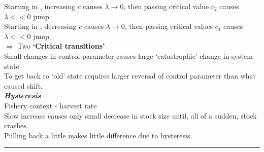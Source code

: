 \documentclass{article}
\newcommand{\ind}{\-\hspace{1cm}}
\newcommand*\circled[1]{\tikz[baseline=(char.base)]{
            \node[shape=circle,draw,inner sep=2pt] (char) {#1};}}
\begin{document}
Starting in \circled{3}, increasing $c$ causes $\lambda \to 0$, then passing critical value $c_2$ causes $\lambda << 0$ jump.\\
Starting in \circled{2}, decreasing $c$ causes $\lambda \to 0$, then passing critical values $c_1$ causes $\lambda << 0$ jump.\\

$\Rightarrow$ Two \textbf{`Critical transitions'}\\
\ind Small changes in control parameter causes large `catastrophic' change in system state\\
To get back to `old' state requires larger reversal of control parameter than what caused shift.\\
\ind \textbf{\emph{Hysteresis}}\\

Fishery context - harvest rate\\
\ind Slow increase causes only small decrease in stock size until, all of a sudden, stock crashes.\\
\ind Pulling back a little makes little difference due to hysteresis.\\

\rule[0.5ex]{\linewidth}{1pt}
\end{document}
